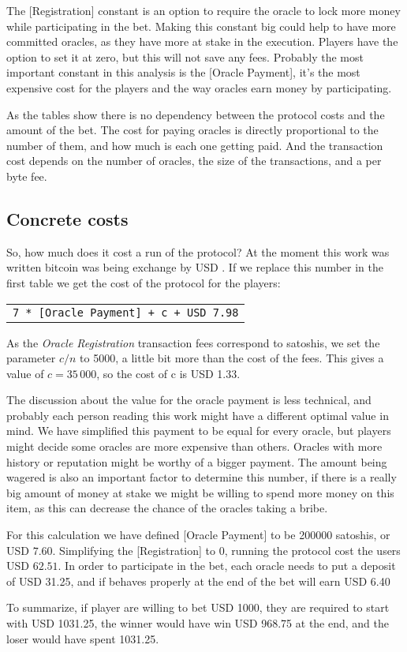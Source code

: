 The [Registration] constant is an option to require the oracle to lock more
  money while participating in the bet.
Making this constant big could help to have more committed oracles, as they
  have more at stake in the execution.
Players have the option to set it at zero, but this will not save any fees.
Probably the most important constant in this analysis is the [Oracle Payment],
  it's the most expensive cost for the players and the way oracles earn money
  by participating.

As the tables show there is no dependency between the protocol costs and the
  amount of the bet.
The cost for paying oracles is directly proportional to the number of them, and
  how much is each one getting paid.
And the transaction cost depends on the number of oracles, the size of the
  transactions, and a per byte fee.

\subsection{Concrete costs}

So, how much does it cost a run of the protocol?
At the moment this work was written bitcoin was being exchange by USD
  \bitcoinusd{}.
If we replace this number in the first table we get the cost of the protocol for
  the players:
\begin{center}
    \begin{tabular}{|c|}
        \texttt{7 * [Oracle Payment] + c + USD 7.98}
    \end{tabular}
\end{center}

As the \textit{Oracle Registration} transaction fees correspond to
  \mbox{} satoshis, we set the parameter $c/n$ to 5000, a
  little bit more than the cost of the fees.
This gives a value of $c = 35\,000$, so the cost of c is USD 1.33.

The discussion about the value for the oracle payment is less technical, and
  probably each person reading this work might have a different optimal value
  in mind.
We have simplified this payment to be equal for every oracle, but players
  might decide some oracles are more expensive than others.
Oracles with more history or reputation might be worthy of a bigger payment.
The amount being wagered is also an important factor to determine this number,
  if there is a really big amount of money at stake we might be willing to
  spend more money on this item, as this can decrease the chance of the oracles
  taking a bribe.

For this calculation we have defined [Oracle Payment] to be \num{200000}
  satoshis, or USD $7.60$. Simplifying the [Registration] to 0, running the
  protocol cost the users USD $62.51$.
In order to participate in the bet, each oracle needs to put a deposit of
  USD 31.25, and if behaves properly at the end of the bet will earn USD 6.40

To summarize, if player are willing to bet USD 1000, they are required to start
  with USD 1031.25, the winner would have win USD 968.75 at the end, and the
  loser would have spent 1031.25.
